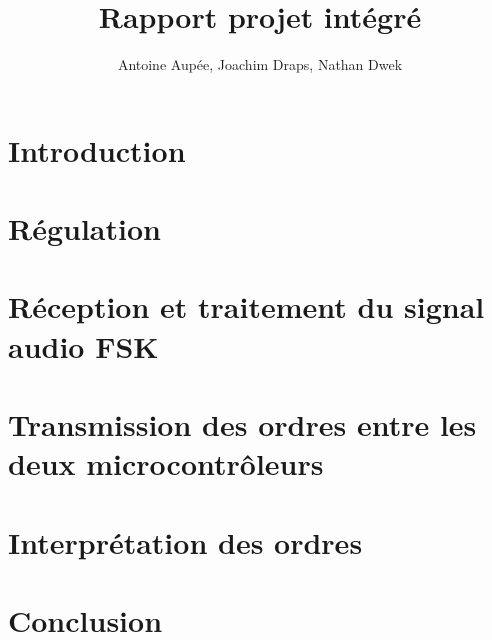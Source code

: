 \documentclass[a4paper, 11pt, frenchb]{report}
\title{Rapport projet intégré}
\author{Antoine Aupée, Joachim Draps, Nathan Dwek}
\begin{document}

\setcounter{page}{2}
\tableofcontents

\chapter{Introduction}


\chapter{Régulation\label{chap:regul}}


\chapter{Réception et traitement du signal audio FSK\label{chap:audio}}


\chapter{Transmission des ordres entre les deux microcontrôleurs\label{chap:uart}}


\chapter{Interprétation des ordres\label{chap:decision}}


\chapter{Conclusion\label{chap:conclusion}}
%

\listoffigures
\setcounter{page}{1}

\end{document}
